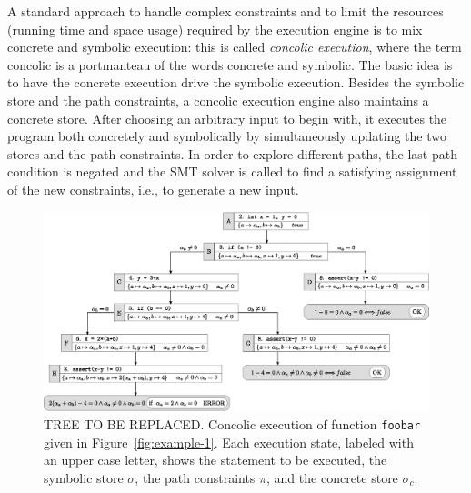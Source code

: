 A standard approach to handle complex constraints and to limit the resources (running time and space usage) required by the execution engine is to mix concrete and symbolic execution: this is called {\em concolic execution}, where the term concolic is a portmanteau of the words concrete and symbolic. The basic idea is to have the concrete execution drive the symbolic execution. Besides the symbolic store and the path constraints, a concolic execution engine also maintains a concrete store. After choosing an arbitrary input to begin with, it executes the program both concretely and symbolically by simultaneously updating the two stores and the path constraints. In order to explore different paths, the last path condition is negated and the SMT solver is called to find a satisfying assignment of the new constraints, i.e., to generate a new input.

\begin{figure}[t]
  \centering
  \includegraphics[width=1.0\columnwidth]{images/execution-tree.eps} 
  \caption{TREE TO BE REPLACED. Concolic execution of function {\tt foobar} given in Figure~\ref{fig:example-1}. Each execution state, labeled with an upper case letter, shows the statement to be executed, the symbolic store $\sigma$, the path constraints $\pi$, and the concrete store $\sigma_c$. }
  \label{fig:example-concolic-execution}
\end{figure}

\vspace{1mm}
\begin{center}
\end{center}
\vspace{2mm}

